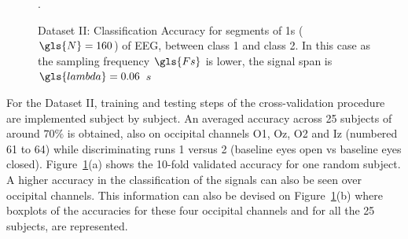 \begin{figure}[h!]
\centering
{}
\caption[PhysioNet Dataset Binary Classification Accuracy]{Dataset II: Classification Accuracy for segments of 1s ($\gls{N} = 160$) of EEG, between class 1 and class 2.  In this case as the sampling frequency $\gls{Fs}$ is lower, the signal span is $\gls{lambda} = 0.06$   $\si{s}$}.
\label{fig:alpharesultsdatasetii}
\end{figure}


For the Dataset II, training and testing steps of the cross-validation procedure are implemented subject by subject.  An averaged accuracy across 25 subjects of around $70\%$ is obtained, also on occipital channels O1, Oz, O2 and Iz (numbered 61 to 64) while discriminating runs 1 versus 2 (baseline eyes open vs baseline eyes closed).  Figure~\ref{fig:alpharesultsdatasetii}(a) shows the 10-fold validated accuracy for one random subject. A higher accuracy in the classification of the signals can also be seen over occipital channels.  This information can also be devised on Figure~\ref{fig:alpharesultsdatasetii}(b) where boxplots of the accuracies for these four occipital channels and for all the 25 subjects, are represented. 

